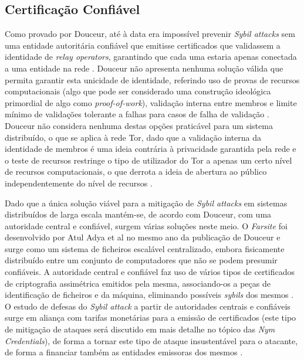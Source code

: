\subsection{Certificação Confiável}
\label{ssec:certificacao_confiavel}

Como provado por Douceur, até à data era impossível prevenir \textit{Sybil attacks} sem uma entidade autoritária confiável que emitisse certificados que validassem a identidade de \textit{relay operators}, garantindo que cada uma estaria apenas conectada a uma entidade na rede \cite{douceur2002sybil}. Douceur não apresenta nenhuma solução válida que permita garantir esta unicidade de identidade, referindo uso de provas de recursos computacionais (algo que pode ser considerado uma construção ideológica primordial de algo como \textit{proof-of-work}), validação interna entre membros e limite mínimo de validações tolerante a falhas para casos de falha de validação \cite{douceur2002sybil}. Douceur não considera nenhuma destas opções praticável para um sistema distribuído, o que se aplica à rede Tor, dado que a validação interna da identidade de membros é uma ideia contrária à privacidade garantida pela rede e o teste de recursos restringe o tipo de utilizador do Tor a apenas um certo nível de recursos computacionais, o que derrota a ideia de abertura ao público independentemente do nível de recursos \cite{dingledine2004tor}.

Dado que a única solução viável para a mitigação de \textit{Sybil attacks} em sistemas distribuídos de larga escala mantém-se, de acordo com Douceur, com uma autoridade central e confiável, surgem várias soluções neste meio. O \textit{Farsite} foi desenvolvido por Atul Adya et al no mesmo ano da publicação de Douceur e surge como um sistema de ficheiros escalável centralizado, embora fisicamente distribuído entre um conjunto de computadores que não se podem presumir confiáveis. A autoridade central e confiável faz uso de vários tipos de certificados de criptografia assimétrica emitidos pela mesma, associando-os a peças de identificação de ficheiros e da máquina, eliminando possíveis \textit{sybils} dos mesmos \cite{adya2002farsite, douceur2002sybil}. O estudo de defesas do \textit{Sybil attack} a partir de autoridades centrais e confiáveis surge em aliança com tarifas monetárias para a emissão de certificados (este tipo de mitigação de ataques será discutido em mais detalhe no tópico das \textit{Nym Credentials}), de forma a tornar este tipo de ataque insustentável para o atacante, de forma a financiar também as entidades emissoras dos mesmos \cite{castro2002secure}.

